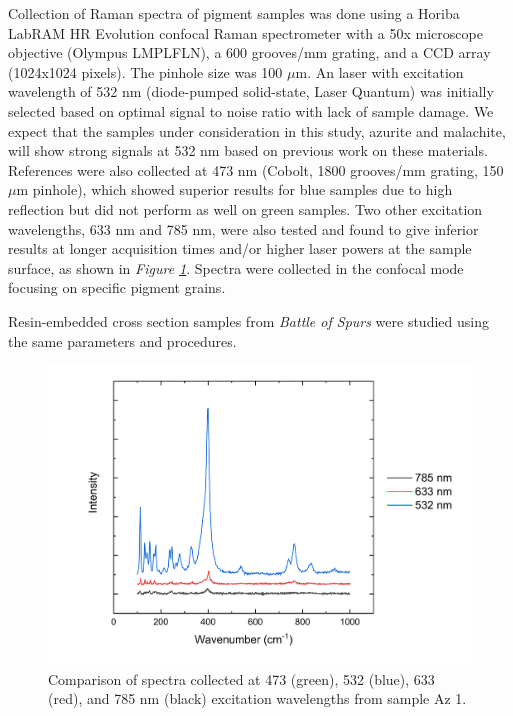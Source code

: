 Collection of Raman spectra of pigment samples was done using a Horiba LabRAM HR Evolution confocal Raman spectrometer with a 50x microscope objective (Olympus LMPLFLN), a 600 grooves/mm grating, and a CCD array (1024x1024 pixels). The pinhole size was 100 $\mu$m. An laser with excitation wavelength of 532 nm (diode-pumped solid-state, Laser Quantum) was initially selected based on optimal signal to noise ratio with lack of sample damage. We expect that the samples under consideration in this study, azurite and malachite, will show strong signals at 532 nm based on previous work on these materials.~\autocite{Bicchieri} References were also collected at 473 nm (Cobolt, 1800 grooves/mm grating, 150 $\mu$m pinhole), which showed superior results for blue samples due to high reflection but did not perform as well on green samples. Two other excitation wavelengths, 633 nm and 785 nm, were also tested and found to give inferior results at longer acquisition times and/or higher laser powers at the sample surface, as shown in \textit{Figure \ref{fig:Az1_wavelength_comparison}}. Spectra were collected in the confocal mode focusing on specific pigment grains.

Resin-embedded cross section samples from \textit{Battle of Spurs} were studied using the same parameters and procedures.

\begin{figure}[H]
\centering
  \includegraphics[width=0.75\linewidth]{Az1_wavelength_comparison}
\caption[Comparison of spectra collected at 473, 532, 633, and 785 nm excitation wavelengths from sample Az 1.]{Comparison of spectra collected at 473 (green), 532 (blue), 633 (red), and 785 nm (black) excitation wavelengths from sample Az 1.}
\label{fig:Az1_wavelength_comparison}
\end{figure}

